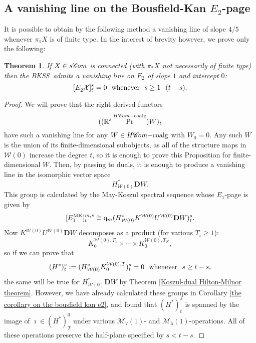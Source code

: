 \documentclass[11pt]{amsart} \renewcommand{\baselinestretch}{1.2}
\theoremstyle{plain}
\newtheorem{thm}{Theorem}[section] %
\numberwithin{equation}{section} %
\theoremstyle{plain}
\newtheorem{thm}{Theorem}[chapter] %
\numberwithin{equation}{chapter} %
\DeclareMathOperator{\Prim}{Pr}
\newcommand{\scrC}{\mathscr{C}}
\newcommand{\calX}{\mathcal{X}}
\newcommand{\calw}{\mathcal{W}}
\newcommand{\calx}{\mathcal{X}}
\newcommand{\calMv}{\mathcal{M}\dver}
\newcommand{\calMh}{\mathcal{M}\dhor}
\newcommand{\HC}[1]{H#1\mathrm{-coalg}}
\newcommand{\quadgrad}[1]{\mathrm{q}_{#1}}
\newcommand{\algs}{{\scrC\!\textit{\normalfont\textit{om}}}}
\newcommand{\E}[5]{[E^{#1}_{#2}#3]^{#4}_{#5}}
\newcommand{\dver}{_\mathrm{v}}
\newcommand{\dhor}{_\mathrm{h}}
\newcommand{\dual}{\mathbf{D}}
\newcommand{\BKSS}{BKSS}
\newcommand{\SubsectionOrSection}[1]{\subsection{#1}}
\begin{document}
\begin{May sseq and vanishing line}
\SubsectionOrSection{A vanishing line on the Bousfield-Kan $E_2$-page}
\label{A vanishing line on the Bousfield-Kan}
It is possible to obtain by the following method a vanishing line of slope $4/5$ whenever $\pi_1X$ is of finite type. In the interest of brevity however, we prove only the following:
\begin{thm}
\label{vanishing line thm}
If $X\in s\algs$ is connected (with $\pi_*X$ not necessarily of finite type) then the \BKSS\ admits a vanishing line on $E_2$ of slope $1$ and intercept $0$:
\[\E{}{2}{\calx}{s}{t}=0\textup{ \ whenever \ }s\geq 1\cdot( t-s).\]
\end{thm}
\begin{proof}
We will prove that the right derived functors
\[((\mathbb{R}^s\Prim^{\HC{\algs}})W)_t\]
have such a vanishing line for any $W\in \HC{\algs}$ with $W_0=0$. Any such $W$ is the union of its finite-dimensional subobjects, as all of the structure maps in $\calw(0)$ increase the degree $t$, so it is enough to prove this Proposition for finite-dimensional $W$. Then, by passing to duals, it is enough to produce a vanishing line in the isomorphic vector space
\[H^*_{\calw(0)}\dual W.\]
This group is calculated by the May-Koszul spectral sequence whose $E_1$-page is given by
\[\E{\textup{MK}}{1}{}{m,s}{t}\cong \quadgrad{m}(H^*_{\calw(0)}K^{\calw(0)}U^{\calw(0)}\dual W)^{s}_{t}.\]
Now $K^{\calw(0)}U^{\calw(0)}\dual W$ decomposes as a product (for various $T_i\geq1$):
\[K_{0}^{\calw(0),T_1}\times\cdots \times K_{0}^{\calw(0),T_N},\]
so if we can prove that
\[(H^*)^s_t:=(H^{*}_{\calw(0)}K_0^{\calw(0),T})^s_t=0 \textup{ \ whenever \ }s\geq t-s,\]
the same will be true for $H^*_{\calw(0)}\dual W$ by Theorem \ref{Koszul-dual Hilton-Milnor theorem}. %
However, we have already calculated these groups in Corollary \ref{the corollary on the bousfield kan e2}, and found that $(H^*)^s_t$ is spanned by the image of $\imath\in (H^*)^0_T$ under various $\calMv(1)$- and $\calMh(1)$-operations. All of these operations preserve the half-plane specified by $s<t-s$.
\end{proof}


\end{May sseq and vanishing line}
\end{document}
